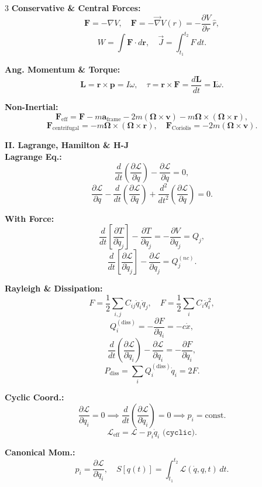 \documentclass[1pt]{article}
\begin{document}
\begin{multicols}{3}
\textbf{Conservative \& Central Forces:} 
\[
\mathbf{F}=-\nabla V,\quad
\mathbf{F}=-\vec{\nabla}V(r)=-\frac{\partial V}{\partial r}\,\hat{r},
\]
\[
W=\int \mathbf{F}\cdot d\mathbf{r},\quad
\vec{J}=\int_{t_1}^{t_2}F\,dt.
\]

\textbf{Ang. Momentum \& Torque:}
\[
\mathbf{L}=\mathbf{r}\times\mathbf{p}=I\omega,\quad
\tau=\mathbf{r}\times\mathbf{F}=\frac{d\mathbf{L}}{dt}=\mathbf{I}\dot{\omega}.
\]

\textbf{Non-Inertial:} 
\[
\mathbf{F}_{\text{eff}}=\mathbf{F}-m\mathbf{a}_{\text{frame}}
-2m(\mathbf{\Omega}\times\mathbf{v})
-m\mathbf{\Omega}\times(\mathbf{\Omega}\times\mathbf{r}),
\]
\[
\mathbf{F}_{\text{centrifugal}}=-m\mathbf{\Omega}\times(\mathbf{\Omega}\times\mathbf{r}),
\quad
\mathbf{F}_{\text{Coriolis}}=-2m(\mathbf{\Omega}\times\mathbf{v}).
\]

\textbf{II. Lagrange, Hamilton \& H-J}\\[2pt]
\textbf{Lagrange Eq.:} 
\[
\frac{d}{dt}\left(\frac{\partial\mathcal{L}}{\partial\dot{q}}\right)
-\frac{\partial\mathcal{L}}{\partial q}=0,
\]
\[
\frac{\partial\mathcal{L}}{\partial q}
-\frac{d}{dt}\left(\frac{\partial\mathcal{L}}{\partial\dot{q}}\right)
+\frac{d^2}{dt^2}\left(\frac{\partial\mathcal{L}}{\partial\ddot{q}}\right)=0.
\]

\textbf{With Force:} 
\[
\frac{d}{dt}\left[\frac{\partial T}{\partial\dot{q}_j}\right]
-\frac{\partial T}{\partial q_j}
=-\frac{\partial V}{\partial q_j}=Q_j,
\]
\[
\frac{d}{dt}\left[\frac{\partial\mathcal{L}}{\partial\dot{q}_j}\right]
-\frac{\partial\mathcal{L}}{\partial q_j}
=Q_j^{(nc)}.
\]

\textbf{Rayleigh \& Dissipation:} 
\[
F=\frac{1}{2}\sum_{i,j}C_{ij}\dot{q}_i\dot{q}_j,\quad
F=\frac{1}{2}\sum_i C_i\dot{q}_i^2,
\]
\[
Q_i^{(\text{diss})}=-\frac{\partial F}{\partial\dot{q}_i}=-c\dot{x},
\]
\[
\frac{d}{dt}\left(\frac{\partial\mathcal{L}}{\partial\dot{q}_i}\right)
-\frac{\partial\mathcal{L}}{\partial q_i}
=-\frac{\partial F}{\partial\dot{q}_i},
\]
\[
P_{\text{diss}}=\sum_i Q_i^{(\text{diss})}\dot{q}_i=2F.
\]

\textbf{Cyclic Coord.:} 
\[
\frac{\partial\mathcal{L}}{\partial q_i}=0
\implies\frac{d}{dt}\left(\frac{\partial\mathcal{L}}{\partial\dot{q}_i}\right)=0
\implies p_i=\text{const.}
\]
\[
\mathcal{L}_{\text{eff}}=\mathcal{L}-p_i\dot{q}_i\,\,\texttt{(cyclic)}.
\]

\textbf{Canonical Mom.:} 
\[
p_i=\frac{\partial\mathcal{L}}{\partial\dot{q}_i},\quad
S[q(t)]=\int_{t_1}^{t_2}\mathcal{L}(\dot{q},q,t)\,dt.
\]


\end{multicols}
\end{document}
